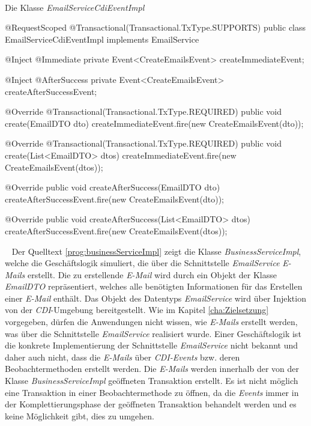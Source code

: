 \ \begin{program}
\caption{Die Klasse \emph{EmailServiceCdiEventImpl}}
\label{prog:emailServiceCdiEventImpl}
\begin{JavaCode}
@RequestScoped
@Transactional(Transactional.TxType.SUPPORTS)
public class EmailServiceCdiEventImpl implements EmailService {

    @Inject
    @Immediate
    private Event<CreateEmailsEvent> createImmediateEvent;
    
    @Inject
    @AfterSuccess
    private Event<CreateEmailsEvent> createAfterSuccessEvent;

    @Override
    @Transactional(Transactional.TxType.REQUIRED)
    public void create(EmailDTO dto) {
        createImmediateEvent.fire(new CreateEmailsEvent(dto));
    }

    @Override
    @Transactional(Transactional.TxType.REQUIRED)
    public void create(List<EmailDTO> dtos) {
        createImmediateEvent.fire(new CreateEmailsEvent(dtos));
    }

    @Override
    public void createAfterSuccess(EmailDTO dto) {
        createAfterSuccessEvent.fire(new CreateEmailsEvent(dto));
    }

    @Override
    public void createAfterSuccess(List<EmailDTO> dtos) {
        createAfterSuccessEvent.fire(new CreateEmailsEvent(dtos));
    }
    
}
\end{JavaCode}
\end{program}
\ \newline
Der Quelltext \ref{prog:businessServiceImpl} zeigt die Klasse \emph{BusinessServiceImpl}, welche die Geschäftslogik simuliert, die über die Schnittstelle \emph{EmailService} \emph{E-Mails} erstellt. Die zu erstellende \emph{E-Mail} wird durch ein Objekt der Klasse \emph{EmailDTO} repräsentiert, welches alle benötigten Informationen für das Erstellen einer \emph{E-Mail} enthält. Das Objekt des Datentyps \emph{EmailService} wird über Injektion von der \emph{CDI}-Umgebung bereitgestellt. Wie im Kapitel \ref{cha:Zielsetzung} vorgegeben, dürfen die Anwendungen nicht wissen, wie \emph{E-Mails} erstellt werden, was über die Schnittstelle \emph{EmailService} realisiert wurde. Einer Geschäftslogik ist die konkrete Implementierung der Schnittstelle \emph{EmailService} nicht bekannt und daher auch nicht, dass die \emph{E-Mails} über \emph{CDI-Events} bzw. deren Beobachtermethoden erstellt werden.
\newline
\newline
Die \emph{E-Mails} werden innerhalb der von der Klasse \emph{BusinessServiceImpl} geöffneten Transaktion erstellt. Es ist nicht möglich eine Transaktion in einer Beobachtermethode zu öffnen, da die \emph{Events} immer in der Komplettierungsphase der geöffneten Transaktion behandelt werden und es keine Möglichkeit gibt, dies zu umgehen.
